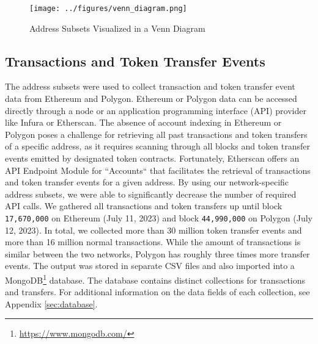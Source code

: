 \documentclass[12pt,a4paper,titlepage,oneside,english]{article}
\begin{document}
\begin{figure}[h!]
	\centering
	\texttt{[image: ../figures/venn\_diagram.png]}
	\caption{Address Subsets Visualized in a Venn Diagram}
	\label{fig:Venn}
\end{figure} 

\subsection{Transactions and Token Transfer Events}
The address subsets were used to collect transaction and token transfer event data from Ethereum and Polygon. Ethereum or Polygon data can be accessed directly through a node or an application programming interface (API) provider like Infura or Etherscan. The absence of account indexing in Ethereum or Polygon poses a challenge for retrieving all past transactions and token transfers of a specific address, as it requires scanning through all blocks and token transfer events emitted by designated token contracts. Fortunately, Etherscan offers an API Endpoint Module for ``Accounts`` that facilitates the retrieval of transactions and token transfer events for a given address. By using our network-specific address subsets, we were able to significantly decrease the number of required API calls. 
We gathered all transactions and token transfers up until block \texttt{17,670,000} on Ethereum (July 11, 2023) and block \texttt{44,990,000} on Polygon (July 12, 2023). In total, we collected more than 30 million %
token transfer events and more than 16 million %
 normal transactions. While the amount of transactions is similar between the two networks, Polygon has roughly three times more transfer events. \newline The output was stored in separate CSV files and also imported into a MongoDB\footnote{\url{https://www.mongodb.com/}} database. The database contains distinct collections for transactions and transfers. For additional information on the data fields of each collection, see Appendix \ref{sec:database}. 
 

\iffalse
Transfer Events: 30,689,978
Transfer Events Ethereum: 7,832,778
Transfer Events Polygon: 22,857,200

Transactions = 16,092,531
Transactions Ethereum = 8,448,584
Transactions Polygon = 7,643,947

Figure X visualizes the number of daily transactions and token transfers for each chain.
\begin{figure}[h!]
	\centering
	\texttt{[image: ../figures/transfers\_tx\_by\_chain.png]}
	\caption{Monthly Transactions and Token Transfers by chain}
	\label{fig:Data}
\end{figure} 
Transfer Events, adding Information (isInSet) \\
Transactions \\
Filtering, Intra-set transfers\\
Data Structure, Fields \\
\fi
\end{document}
